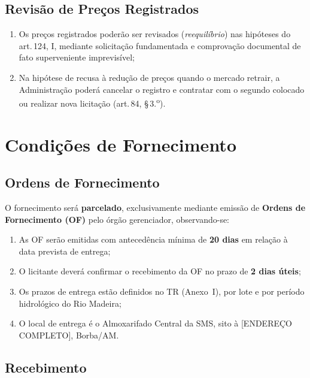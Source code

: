 \documentclass[12pt,a4paper]{article}
\newcommand{\art}[1]{art.\,#1}
\begin{document}
\subsection{Revisão de Preços Registrados}

\begin{enumerate}
  \item Os preços registrados poderão ser revisados (\textit{reequilíbrio}) nas
    hipóteses do \art{124}, I, mediante solicitação fundamentada e comprovação
    documental de fato superveniente imprevisível;

  \item Na hipótese de recusa à redução de preços quando o mercado retrair, a
    Administração poderá cancelar o registro e contratar com o segundo colocado ou
    realizar nova licitação (\art{84}, \S\,3.\textsuperscript{o}).
\end{enumerate}

\section{Condições de Fornecimento}

\subsection{Ordens de Fornecimento}

O fornecimento será \textbf{parcelado}, exclusivamente mediante emissão de
\textbf{Ordens de Fornecimento (OF)} pelo órgão gerenciador, observando-se:

\begin{enumerate}
  \item As OF serão emitidas com antecedência mínima de \textbf{20 dias} em relação
    à data prevista de entrega;
  \item O licitante deverá confirmar o recebimento da OF no prazo de \textbf{2 dias
    úteis};
  \item Os prazos de entrega estão definidos no TR (Anexo~I), por lote e por período
    hidrológico do Rio Madeira;
  \item O local de entrega é o Almoxarifado Central da SMS, sito à
    [ENDEREÇO COMPLETO], Borba/AM.
\end{enumerate}

\subsection{Recebimento}
\end{document}
